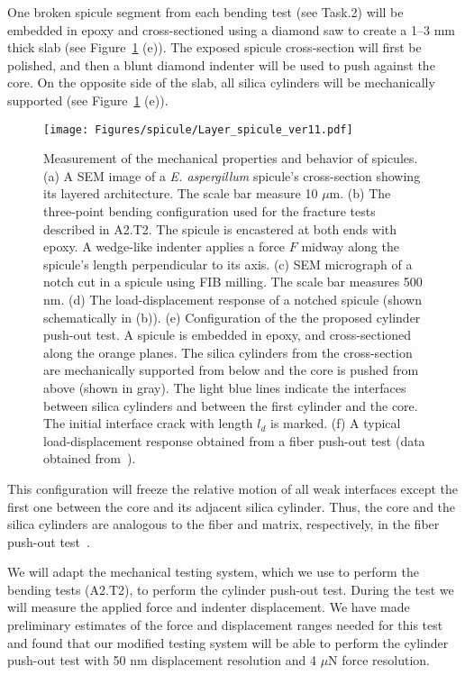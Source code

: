 \documentclass[10pt,letterpaper]{article}
\begin{document}
        One broken spicule segment from each bending test (see Task.2) will be embedded in epoxy and cross-sectioned using a diamond saw to create a 1--3 mm thick slab (see Figure~\ref{f:exp} (e)).
        The exposed spicule cross-section will first be polished, and then a blunt diamond indenter will be used to push against the core.
        On the opposite side of the slab, all silica cylinders will be mechanically supported (see Figure~\ref{f:exp} (e)).
        \begin{figure}[t!]
          \centering
            \texttt{[image: Figures/spicule/Layer\_spicule\_ver11.pdf]}
            \caption{\footnotesize Measurement of the mechanical properties and behavior of spicules. (a) A SEM image of a \textit{E. aspergillum} spicule's cross-section showing its layered architecture. The scale bar measure 10 $\mu$m. (b) The three-point bending configuration used for the fracture tests described in A2.T2. The spicule is encastered at both ends with epoxy. A wedge-like indenter applies a force $F$ midway along the spicule's length perpendicular to its axis. (c) SEM micrograph of a notch cut in a spicule using FIB milling. The scale bar measures 500 nm. (d) The load-displacement response of a notched spicule (shown schematically in (b)). (e) Configuration of the the proposed cylinder push-out test. A spicule is embedded in epoxy, and cross-sectioned along the orange planes. The silica cylinders from the cross-section are mechanically supported from below and the core is pushed from above (shown in gray). The light blue lines indicate the interfaces between silica cylinders and between the first cylinder and the core. The initial interface crack with length $l_d$ is marked. (f) A typical load-displacement response obtained from a fiber push-out test (data obtained from~\cite{bright1989interfacial}).}
            \label{f:exp}
        \end{figure}
        This configuration will freeze the relative motion of all weak interfaces except the first one between the core and its adjacent silica cylinder.
        Thus, the core and the silica cylinders are analogous to the fiber and matrix, respectively, in the fiber push-out test~\cite{marshall1984indentation}.

        We will adapt the mechanical testing system, which we use to perform the bending tests (A2.T2), to perform the cylinder push-out test. During the test we will measure the applied force and indenter displacement.
        We have made preliminary estimates of the force and displacement ranges needed for this test and found that our modified testing system will be able to perform the cylinder push-out test with 50 nm displacement resolution and 4 $\mu$N force resolution.
\end{document}
